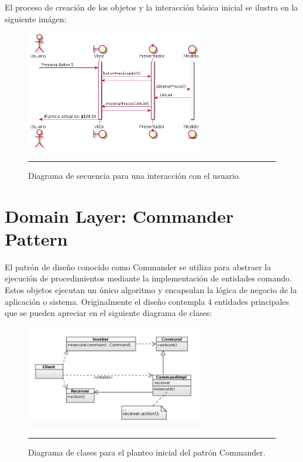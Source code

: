 El proceso de creación de los objetos y la interacción básica inicial se ilustra en la siguiente imágen:

\begin{figure}[htbp]
	\centering
	\includegraphics[width=0.7\textwidth]{Figures/uml_mvp_sequence.png}
	\rule{35em}{1pt}
	\caption[MVP Sequence]{Diagrama de secuencia para una interacción con el usuario.}
	\label{fig:uml_mvp_sequence}
\end{figure}

\section{Domain Layer: Commander Pattern}
El patrón de diseño conocido como Commander se utiliza para abstraer la ejecución de procedimientos mediante la implementación de entidades comando. Estos objetos ejecutan un único algoritmo y encapsulan la lógica de negocio de la aplicación o sistema.
Originalmente el diseño contempla 4 entidades principales que se pueden apreciar en el siguiente diagrama de clases:

\begin{figure}[htbp]
	\centering
	\includegraphics[width=0.7\textwidth]{Figures/uml_clases_commander.png}
	\rule{35em}{1pt}
	\caption[Commander Classes]{Diagrama de clases para el planteo inicial del patrón Commander.}
	\label{fig:uml_clases_commander}
\end{figure}

